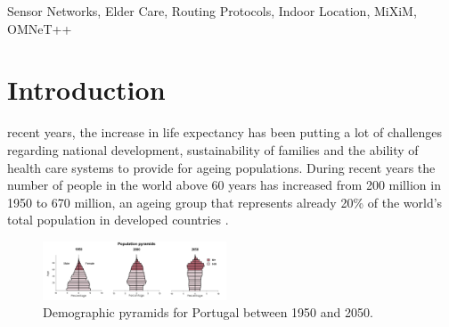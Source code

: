 


\begin{IEEEkeywords}
Sensor Networks, Elder Care, Routing Protocols, Indoor Location, MiXiM, OMNeT++
\end{IEEEkeywords}

%
\IEEEpeerreviewmaketitle

\section{Introduction}
% 
% 
% 
% 
 recent years, the increase in life expectancy has been putting a lot of challenges regarding national development, sustainability of families and the ability of health care systems to provide for ageing populations. During recent years the number of people in the world above 60 years has increased from 200 million in 1950 to 670 million, an ageing group that represents already 20\% of the world's total population in developed countries \cite{1}.

\begin{figure}[!htb]
  \centering
  \includegraphics[width=0.485\textwidth]{img/01_demografia_pt.png}
  \caption{Demographic pyramids for Portugal between 1950 and 2050\cite{1}.}
  \label{fig:1:demog_pt}
\end{figure}
 
